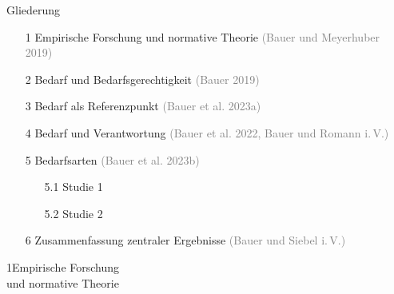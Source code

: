 \documentclass[xcolor=table,9pt,aspectratio=169]{beamer}
\begin{document}
\begin{frame}{\vspace*{10mm}Gliederung}
\begin{itemize}
   \item[1] \hspace*{1em}Empirische Forschung und normative Theorie \textcolor{gray}{(Bauer und Meyerhuber 2019)}
   \item[2] \hspace*{1em}Bedarf und Bedarfsgerechtigkeit \textcolor{gray}{(Bauer 2019)}
   \item[3] \hspace*{1em}Bedarf als Referenzpunkt \textcolor{gray}{(Bauer et al. 2023a)}
   \item[4] \hspace*{1em}Bedarf und Verantwortung \textcolor{gray}{(Bauer et al. 2022, Bauer und Romann i.\,V.)}
   \item[5] \hspace*{1em}Bedarfsarten \textcolor{gray}{(Bauer et al. 2023b)}
   \begin{itemize}
      \item[5.1] \hspace*{1em}Studie 1
      \item[5.2] \hspace*{1em}Studie 2
   \end{itemize}
   \item[6] \hspace*{1em}Zusammenfassung zentraler Ergebnisse \textcolor{gray}{(Bauer und Siebel i.\,V.)}
\end{itemize}
\end{frame}


\begin{frame}
\begin{overlayarea}{\textwidth}{0.81\paperheight}{
   \vspace*{11mm}
   \textcolor{uolblue}
   {1\hspace*{1em}Empirische Forschung\\\hspace*{1.5em}und normative Theorie}
}
\end{overlayarea}
\end{frame}
\end{document}
